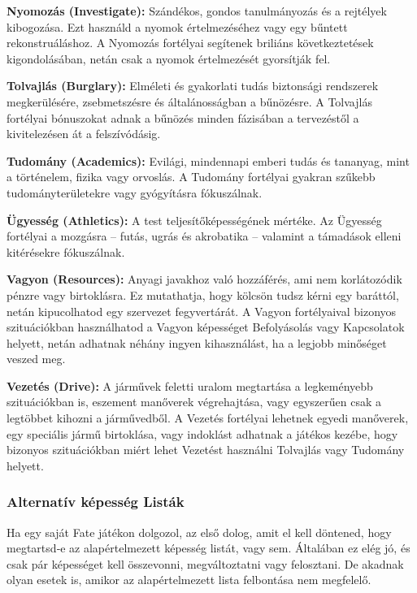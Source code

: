 \documentclass[oneside]{book}
\begin{document}
\textbf{Nyomozás (Investigate):} Szándékos, gondos tanulmányozás és a rejtélyek kibogozása. Ezt használd a nyomok értelmezéséhez vagy egy bűntett rekonstruáláshoz. A Nyomozás fortélyai segítenek briliáns következtetések kigondolásában, netán csak a nyomok értelmezését gyorsítják fel.

\textbf{Tolvajlás (Burglary):} Elméleti és gyakorlati tudás biztonsági rendszerek megkerülésére, zsebmetszésre és általánosságban a bűnözésre. A Tolvajlás fortélyai bónuszokat adnak a bűnözés minden fázisában a tervezéstől a kivitelezésen át a felszívódásig.

\textbf{Tudomány (Academics):} Evilági, mindennapi emberi tudás és tananyag, mint a történelem, fizika vagy orvoslás. A Tudomány fortélyai gyakran szűkebb tudományterületekre vagy gyógyításra fókuszálnak.

\textbf{Ügyesség (Athletics):} A test teljesítőképességének mértéke. Az Ügyesség fortélyai a mozgásra – futás, ugrás és akrobatika – valamint a támadások elleni kitérésekre fókuszálnak.

\textbf{Vagyon (Resources):} Anyagi javakhoz való hozzáférés, ami nem korlátozódik pénzre vagy birtoklásra.  Ez mutathatja, hogy kölcsön tudsz kérni egy baráttól, netán kipucolhatod egy szervezet fegyvertárát. A Vagyon fortélyaival bizonyos szituációkban használhatod a Vagyon képességet Befolyásolás vagy Kapcsolatok helyett, netán adhatnak néhány ingyen kihasználást, ha a legjobb minőséget veszed meg.

\newpage

\textbf{Vezetés (Drive):} A járművek feletti uralom megtartása a legkeményebb szituációkban is, eszement manőverek végrehajtása, vagy egyszerűen csak a legtöbbet kihozni a járművedből. A Vezetés fortélyai lehetnek egyedi manőverek, egy speciális jármű birtoklása, vagy indoklást adhatnak a játékos kezébe, hogy bizonyos szituációkban miért lehet Vezetést használni Tolvajlás vagy Tudomány helyett.

\subsubsection{Alternatív képesség Listák}

Ha egy saját Fate játékon dolgozol, az első dolog, amit el kell döntened, hogy megtartsd‑e az alapértelmezett képesség listát, vagy sem. Általában ez elég jó, és csak pár képességet kell összevonni, megváltoztatni vagy felosztani. De akadnak olyan esetek is, amikor az alapértelmezett lista felbontása nem megfelelő. 
\end{document}
